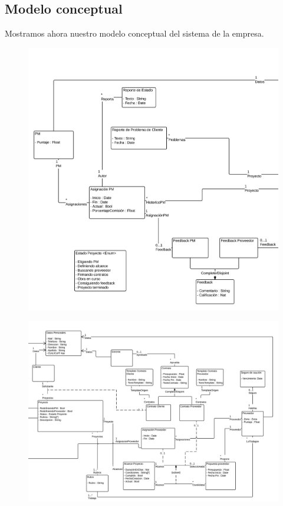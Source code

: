 \subsection{Modelo conceptual}

Mostramos ahora nuestro modelo conceptual del sistema de la empresa. 

\begin{figure}[H]
\includegraphics[width=\linewidth]{diag/nuevos/concept2.png}
\end{figure}
\begin{figure}[H]
\includegraphics[width=\linewidth]{diag/nuevos/concept1.png}
\end{figure}

